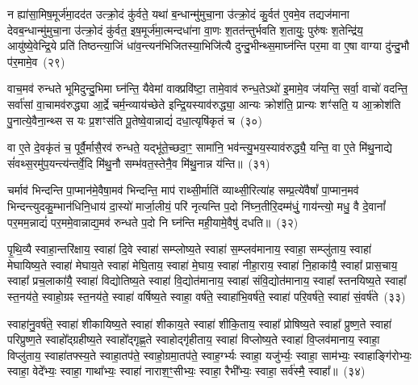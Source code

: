 {%
न ह्या॑सा॒मिष॒मूर्ज॑मा॒दद॑त उत्क्रो॒दं कु॑र्वते॒ यथा॑ ब॒न्धान्मु॑मुचा॒ना उ॑त्क्रो॒दं कु॒र्वत॑ ए॒वमे॒व तद्यज॑माना देवब॒न्धान्मु॑मुचा॒ना उ॑त्क्रो॒दं कु॑र्वत॒ इष॒मूर्ज॑मा॒त्मन्दधा॑ना वा॒णः श॒तत॑न्तुर्भवति श॒तायुः॒ पुरु॑षः श॒तेन्द्रि॑य॒ आयु॑ष्ये॒वेन्द्रि॒ये प्रति॑ तिष्ठन्त्या॒जिं धा॑व॒न्त्यन॑भिजितस्या॒भिजि॑त्यै दुन्दु॒भीन्थ्स॒माघ्न॑न्ति पर॒मा वा ए॒षा वाग्या दु॑न्दु॒भौ प॑र॒मामे॒व~(२९)

वाच॒मव॑ रुन्धते भूमिदुन्दु॒भिमा घ्न॑न्ति॒ यैवेमां वाक्प्रवि॑ष्टा॒ तामे॒वाव॑ रुन्ध॒ते\-ऽथो॑ इ॒मामे॒व ज॑यन्ति॒ सर्वा॒ वाचो॑ वदन्ति॒ सर्वा॑सां वा॒चामव॑रुद्ध्या आ॒र्द्रे चर्म॒न्व्याय॑च्छेते इन्द्रि॒यस्याव॑रुद्ध्या॒ आन्यः क्रोश॑ति॒ प्रान्यः शꣳ॑सति॒ य आ॒क्रोश॑ति पु॒नात्ये॒वैना॒न्थ्स स यः प्र॒शꣳस॑ति पू॒तेष्वे॒वान्नाद्यं॑ दधा॒त्यृषि॑कृतं च~(३०)

वा ए॒ते दे॒वकृ॑तं च॒ पूर्वै॒र्मासै॒रव॑ रुन्धते॒ यद्भू॑ते॒च्छदा॒ꣳ॒ सामा॑नि॒ भव॑न्त्यु॒भय॒स्याव॑रुद्ध्यै॒ यन्ति॒ वा ए॒ते मि॑थु॒नाद्ये सं॑वथ्स॒रमु॑प॒यन्त्य॑न्तर्वे॒दि मि॑थु॒नौ सम्भ॑वत॒स्तेनै॒व मि॑थु॒नान्न य॑न्ति॥~(३१)

{\anuvakamend[{व्यृ॑द्ध॒मक्षो॑धुका॒स्ताꣳ समां᳚ प्र॒जाः प॑र॒मामे॒व च॑ त्रि॒ꣳ॒शच्च॑}]}%

चर्माव॑ भिन्दन्ति पा॒प्मान॑मे॒वैषा॒मव॑ भिन्दन्ति॒ माप॑ राथ्सी॒र्माति॑ व्याथ्सी॒रित्या॑ह सम्प्र॒त्ये॑वैषां᳚ पा॒प्मान॒मव॑ भिन्दन्त्युदकु॒म्भान॑धिनि॒धाय॑ दा॒स्यो॑ मार्जा॒लीयं॒ परि॑ नृत्यन्ति प॒दो नि॑घ्न॒तीरि॒दम्म॑धुं॒ गाय॑न्त्यो॒ मधु॒ वै दे॒वानां᳚ पर॒मम॒न्नाद्यं॑ पर॒ममे॒वान्नाद्य॒मव॑ रुन्धते प॒दो नि घ्न॑न्ति मही॒यामे॒वैषु॑ दधति॥~(३२)

{\anuvakamend[{चर्मैका॒न्नप॑ञ्चा॒शत्}]}%

पृ॒थि॒व्यै स्वाहा॒न्तरि॑क्षाय॒ स्वाहा॑ दि॒वे स्वाहा॑ सम्प्लोष्य॒ते स्वाहा॑ स॒म्प्लव॑मानाय॒ स्वाहा॒ सम्प्लु॑ताय॒ स्वाहा॑ मेघायिष्य॒ते स्वाहा॑ मेघाय॒ते स्वाहा॑ मेघि॒ताय॒ स्वाहा॑ मे॒घाय॒ स्वाहा॑ नीहा॒राय॒ स्वाहा॑ नि॒हाका॑यै॒ स्वाहा᳚ प्रास॒चाय॒ स्वाहा᳚ प्रच॒लाका॑यै॒ स्वाहा॑ विद्योतिष्य॒ते स्वाहा॑ वि॒द्योत॑मानाय॒ स्वाहा॑ संवि॒द्योत॑मानाय॒ स्वाहा᳚ स्तनयिष्य॒ते स्वाहा᳚ स्त॒नय॑ते॒ स्वाहो॒ग्रꣴ स्त॒नय॑ते॒ स्वाहा॑ वर्\mbox{}षिष्य॒ते स्वाहा॒ वर्\mbox{}ष॑ते॒ स्वाहा॑भि॒वर्\mbox{}ष॑ते॒ स्वाहा॑ परि॒वर्\mbox{}ष॑ते॒ स्वाहा॑ सं॒वर्\mbox{}ष॑ते~(३३)

स्वाहा॑नु॒वर्\mbox{}ष॑ते॒ स्वाहा॑ शीकायिष्य॒ते स्वाहा॑ शीकाय॒ते स्वाहा॑ शीकि॒ताय॒ स्वाहा᳚ प्रोषिष्य॒ते स्वाहा᳚ प्रुष्ण॒ते स्वाहा॑ परिप्रुष्ण॒ते स्वाहो᳚द्ग्रहीष्य॒ते स्वाहो᳚द्गृह्ण॒ते स्वाहोद्गृ॑हीताय॒ स्वाहा॑ विप्लोष्य॒ते स्वाहा॑ वि॒प्लव॑मानाय॒ स्वाहा॒ विप्लु॑ताय॒ स्वाहा॑तफ्स्य॒ते स्वाहा॒तप॑ते॒ स्वाहो॒ग्रमा॒तप॑ते॒ स्वाह॒र्ग्भ्यः स्वाहा॒ यजु॑र्भ्यः॒ स्वाहा॒ साम॑भ्यः॒ स्वाहाङ्गि॑रोभ्यः॒ स्वाहा॒ वेदे᳚भ्यः॒ स्वाहा॒ गाथा᳚भ्यः॒ स्वाहा॑ नाराश॒ꣳ॒सीभ्यः॒ स्वाहा॒ रैभी᳚भ्यः॒ स्वाहा॒ सर्व॑स्मै॒ स्वाहा᳚॥~(३४)

}
